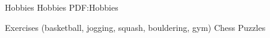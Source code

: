 \documentclass[letterpaper,MMMyyyy,nonstopmode]{simpleresumecv}
\newcommand{\CVNote}{CV compiled on {\today}}
\begin{document}
\begin{Body}




\BigGap

\Section
{Hobbies}
{Hobbies}
{PDF:Hobbies}

\Gap
\BulletItem Exercises (basketball, jogging, squash, bouldering, gym)
\BulletItem Chess
\BulletItem Puzzles



\end{Body}


\end{document}
